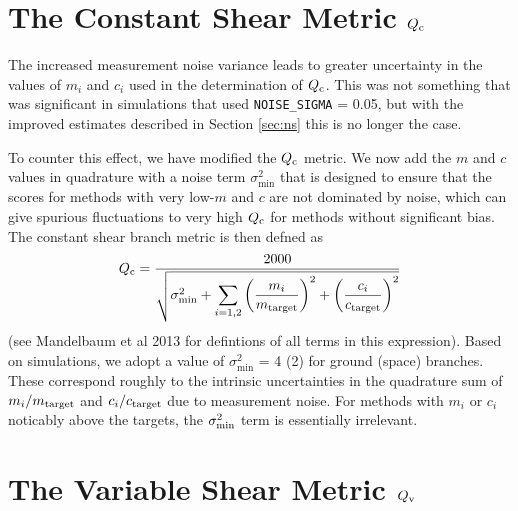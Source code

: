\documentclass[preprint,11pt]{aastex}
\begin{document}
\section{The Constant Shear Metric $Q_{\rm c}$}\label{sec:qc}
The increased measurement noise variance leads to greater
uncertainty in the values of $m_i$ and $c_i$ used in the determination
of $Q_{\rm c}$.  This was not something that was significant in
simulations that used \texttt{NOISE\_SIGMA} = 0.05, but with the
improved estimates described in Section \ref{sec:ns} this is no longer
the case.

To counter this effect, we have modified the $Q_{\rm c}$ metric. We
now add the $m$ and $c$ values in quadrature with a noise term
$\sigma_\text{min}^2$ that is designed to ensure that the scores for
methods with very low-$m$ and $c$ are not dominated by noise, which
can give spurious fluctuations to very high $Q_{\rm c}$ for methods
without significant bias.  The constant shear branch metric is then
defned as
\begin{equation}\label{eq:q_c}
Q_{\rm c} = \frac{2000}{\sqrt{ \sigma_\text{min}^2 + \displaystyle\sum_{i=1,2} \left(
      \frac{m_i}{m_{\rm target}} \right)^2 + \left( \frac{c_i}{c_{\rm target}} \right)^2 }}
\end{equation}
(see Mandelbaum et al 2013 for defintions of all terms in this
expression).  Based on simulations, we adopt a value of
$\sigma_\text{min}^2$ = 4 (2) for ground (space) branches.  These
correspond roughly to the intrinsic uncertainties in the quadrature
sum of $m_i / m_{\rm target}$ and $c_i / c_{\rm target}$ due to
measurement noise. For methods with $m_i$ or $c_i$ noticably above the
targets, the $\sigma^2_{\rm min}$ term is essentially irrelevant.

\section{The Variable Shear Metric $Q_{\rm v}$}\label{sec:qv}
\end{document}
